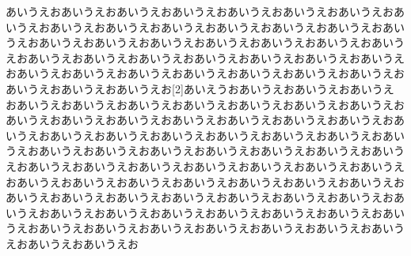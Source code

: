 \documentclass[8pt,b5paper,twoside]{ltjtreport}
\begin{document}
あいうえおあいうえおあいうえおあいうえおあいうえおあいうえおあいうえおあいうえおあいうえおあいうえおあいうえおあいうえおあいうえおあいうえおあいうえおあいうえおあいうえおあいうえおあいうえおあいうえおあいうえおあいうえおあいうえおあいうえおあいうえおあいうえおあいうえおあいうえおあいうえおあいうえおあいうえおあいうえおあいうえおあいうえおあいうえおあいうえおあいうえおあいうえおあいうえお[2\baselineskip]あいえうおあいうえおあいうえおあいうえおあいうえおあいうえおあいうえおあいうえおあいうえおあいうえおあいうえおあいうえおあいうえおあいうえおあいうえおあいうえおあいうえおあいうえおあいうえおあいうえおあいうえおあいうえおあいうえおあいうえおあいうえおあいうえおあいうえおあいうえおあいうえおあいうえおあいうえおあいうえおあいうえおあいうえおあいうえおあいうえおあいうえおあいうえおあいうえおあいうえおあいうえおあいうえおあいうえおあいうえおあいうえおあいうえおあいうえおあいうえおあいうえおあいうえおあいうえおあいうえおあいうえおあいうえおあいうえおあいうえおあいうえおあいうえおあいうえおあいうえおあいうえおあいうえおあいうえおあいうえおあいうえおあいうえおあいうえおあいうえおあいうえおあいうえおあいうえお
\end{document}
